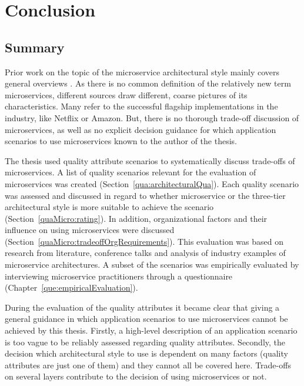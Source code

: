 \chapter{Conclusion}
\label{con}

\section{Summary}
Prior work on the topic of the microservice architectural style mainly covers general overviews \cite{Newman2015,Wolff2016}. 
As there is no common definition of the relatively new term microservices, different sources draw different, coarse pictures of its characteristics.
Many refer to the successful flagship implementations in the industry, like Netflix or Amazon.
But, there is no thorough trade-off discussion of microservices, as well as no explicit decision guidance for which application scenarios to use microservices known to the author of the thesis.

The thesis used quality attribute scenarios to systematically discuss trade-offs of microservices.
A list of quality scenarios relevant for the evaluation of microservices was created (Section~\ref{qua:architecturalQua}).
Each quality scenario was assessed and discussed in regard to whether microservice or the three-tier architectural style is more suitable to achieve the scenario (Section~\ref{quaMicro:rating}).
In addition, organizational factors and their influence on using microservices were discussed (Section~\ref{quaMicro:tradeoffOrgRequirements}).
This evaluation was based on research from literature, conference talks and analysis of industry examples of microservice architectures. 
A subset of the scenarios was empirically evaluated by interviewing microservice practitioners through a questionnaire (Chapter~\ref{que:empiricalEvaluation}).

During the evaluation of the quality attributes it became clear that giving a general guidance in which application scenarios to use microservices cannot be achieved by this thesis.
Firstly, a high-level description of an application scenario is too vague to be reliably assessed regarding quality attributes. 
Secondly, the decision which architectural style to use is dependent on many factors (quality attributes are just one of them) and they cannot all be covered here.
Trade-offs on several layers contribute to the decision of using microservices or not.

